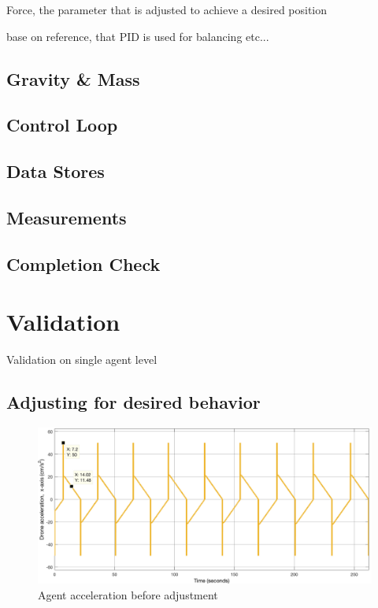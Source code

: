 Force, the parameter that is adjusted to achieve a desired position

base on reference, that PID is used for balancing etc...

\subsection{Gravity \& Mass}
\label{sec:sim_gravity}

\subsection{Control Loop}

\subsection{Data Stores}

\subsection{Measurements}

\subsection{Completion Check}

\section{Validation}
\label{sec:validation}

Validation on single agent level

\subsection{Adjusting for desired behavior}
\label{sec:tuning}

\begin{figure}[H]
  \centering
  \includegraphics[width=1\columnwidth]{figures/SA_accel_pre_adjustment}
  \caption{\label{fig:pre_adjust}Agent acceleration before adjustment}
\end{figure}

